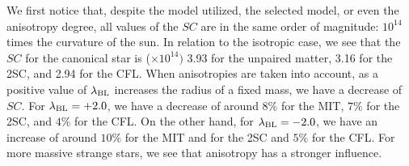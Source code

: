\documentclass[%
reprint,
superscriptaddress,
nofootinbib,
amsmath,
amssymb,
aps,
floatfix,
showkeys,
]{revtex4-2}
\begin{document}
We first notice that, despite the model utilized, the selected model, or even the anisotropy degree, all values of the $SC$ are in the same order of magnitude: $10^{14}$ times the curvature of the sun.
In relation to the isotropic case, we see that the $SC$ for the canonical star is ($\times 10^{14})$ 3.93 for the unpaired matter, 3.16 for the 2SC, and 2.94 for the CFL. When anisotropies are taken into account, as a positive value of $\lambda_{\rm BL}$ increases the radius of a fixed mass, we have a decrease of $SC$. For $\lambda_{\rm BL} = +2.0$, we have a decrease of around $8\%$ for the MIT, $7\%$ for the 2SC, and $4\%$ for the CFL. On the other hand, for $\lambda_{\rm BL} = -2.0$, we have an increase of around $10\%$ for the MIT and for the 2SC and $5\%$ for the CFL. For more massive strange stars, we see that anisotropy has a stronger influence.
\end{document}

